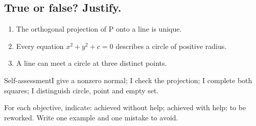 \subsection*{True or false? Justify.}\label{C07-VF}
\begin{enumerate}
\item The orthogonal projection of P onto a line is unique.
\item Every equation $x^2+y^2+c=0$ describes a circle of positive radius.
\item A line can meet a circle at three distinct points.
\end{enumerate}
\begin{repere}{Self-assessment}I give a nonzero normal; I check the projection; I complete both squares; I distinguish circle, point and empty set.

For each objective, indicate: achieved without help; achieved with help; to be reworked. Write one example and one mistake to avoid.\end{repere}
\endgroup
\ifprof\fi
